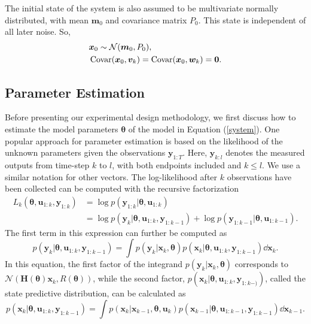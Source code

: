 \\
\\
The initial state of the system is also assumed to be multivariate normally distributed, with mean $\bm m_0$ and covariance matrix $P_0$. This state is independent of all later noise. So,
\begin{equation}
\begin{aligned}
& \bm x_0 \sim \mathcal{N}(\bm m_0,P_0),\\
&\operatorname{\mathrm{Covar}}(\bm x_0,\bm v_k) = \operatorname{\mathrm{Covar}}(\bm x_0,\bm w_k) = \bm 0.
\label{initial state}
\end{aligned}
\end{equation}
\subsection{Parameter Estimation}
Before presenting our experimental design methodology, we first discuss how to estimate the model parameters $\bm \theta$ of the model in Equation  (\ref{system}). One popular approach for parameter estimation is based on the likelihood of the unknown parameters given the observations $\bm y_{1:T}$. Here, $\bm y_{k:l}$ denotes the measured outputs from time-step $k$ to $l$, with both endpoints included and $k \leq l$. We use a similar notation for other vectors.
The log-likelihood after $k$ observations have been collected can be computed with the recursive factorization
\begin{align}
L_k(\bm \theta, \bm u_{1:k}, \bm y_{1:k}) &= \log p(\bm y_{1:k}|\bm \theta, \bm u_{1:k})\\
&=  \log p(\bm y_k|\bm \theta, \bm u_{1:k},\bm y_{1:k-1}) 
+ \log p(\bm y_{1:k-1}|\bm \theta, \bm u_{1:k-1}).
\label{factorization}
\end{align}
The first term in this expression can further be computed as
\begin{equation}
p(\bm y_k|\bm \theta, \bm u_{1:k},\bm y_{1:k-1})
= \int p(\bm y_k|\bm x_k, \bm \theta)p(\bm x_k|\bm \theta, \bm u_{1:k},\bm y_{1:k-1})\dd \bm x_k.
\label{likelihood factor}
\end{equation}
In this equation, the first factor of the integrand $p(\bm y_k|\bm x_k, \bm \theta)$ corresponds to $\mathcal{N}(\bm H(\bm \theta)\bm x_k,R(\bm \theta))$, while the second factor, $p(\bm x_k|\bm \theta, \bm u_{1:k},\bm y_{1:k-)})$, called the state predictive distribution, can be calculated as
\begin{equation}
p(\bm x_k|\bm \theta, \bm u_{1:k},\bm y_{1:k-1}) = \int p(\bm x_k|\bm x_{k-1}, \bm \theta, \bm u_k)
p(\bm x_{k-1}|\bm \theta, \bm u_{1:k-1},\bm y_{1:k-1})\dd \bm x_{k-1}.
\end{equation}
